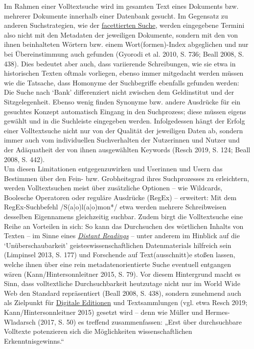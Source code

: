 \documentclass{article}
\begin{document}
    Im Rahmen einer Volltextsuche wird im gesamten Text eines Dokuments bzw. mehrerer Dokumente innerhalb einer Datenbank gesucht. Im Gegensatz zu anderen Suchstrategien, wie der  \href{http://gams.uni-graz.at/o:konde.82}{facettierten Suche}, werden eingegebene Termini also nicht mit den Metadaten der jeweiligen Dokumente, sondern mit den von ihnen beinhalteten Wörtern bzw. einem Wort(formen)-Index abgeglichen und nur bei Übereinstimmung auch gefunden (Gyorodi et al. 2010, S. 736; Beall 2008, S. 438). Dies bedeutet aber auch, dass variierende Schreibungen, wie sie etwa in historischen Texten oftmals vorliegen, ebenso immer mitgedacht werden müssen wie die Tatsache, dass Homonyme der Suchbegriffe ebenfalls gefunden werden: Die Suche nach ‘Bank’ differenziert nicht zwischen dem Geldinstitut und der Sitzgelegenheit. Ebenso wenig finden Synonyme bzw. andere Ausdrücke für ein gesuchtes Konzept automatisch Eingang in den Suchprozess; diese müssen eigens gewählt und in die Suchleiste eingegeben werden. Infolgedessen hängt der Erfolg einer Volltextsuche nicht nur von der Qualität der jeweiligen Daten ab, sondern immer auch vom individuellen Suchverhalten der Nutzerinnen und Nutzer und der Adäquatheit der von ihnen ausgewählten Keywords (Resch 2019, S. 124; Beall 2008, S. 442).
               \\
            
        Um diesen Limitationen entgegenzuwirken und Userinnen und Usern das Bestimmen über den Fein- bzw. Grobheitsgrad ihres Suchprozesses zu erleichtern, werden Volltextsuchen meist über zusätzliche Optionen – wie Wildcards, Boolesche Operatoren oder reguläre Ausdrücke (RegEx) – erweitert: Mit dem RegEx-Suchbefehl /S(a|o)l(a|o)mon*/ etwa werden mehrere Schreibweisen desselben Eigennamens gleichzeitig suchbar. Zudem birgt die Volltextsuche eine Reihe an Vorteilen in sich: So kann das Durchsuchen des wörtlichen Inhalts von Texten – im Sinne eines \emph{\href{http://gams.uni-graz.at/o:konde.71}{Distant Readings}} – unter anderem im Hinblick auf die ‘Unüberschaubarkeit’ geisteswissenschaftlichen Datenmaterials hilfreich sein (Limpinsel 2013, S. 177) und Forschende auf Text(ausschnitt)e stoßen lassen, welche ihnen über eine rein metadatenorientierte Suche eventuell entgangen wären (Kann/Hintersonnleitner 2015, S. 79). Vor diesem Hintergrund macht es Sinn, dass volltextliche Durchsuchbarkeit heutzutage nicht nur im World Wide Web den Standard repräsentiert (Beall 2008, S. 438), sondern zunehmend auch als Zielpunkt für \href{http://gams.uni-graz.at/o:konde.59}{Digitale Editionen} und Textsammlungen (vgl. etwa Resch 2019; Kann/Hintersonnleitner 2015) gesetzt wird – denn wie Müller und Hermes-Wladarsch (2017, S. 50) es treffend zusammenfassen: „Erst über durchsuchbare Volltexte potenzieren sich die Möglichkeiten wissenschaftlichen Erkenntnisgewinns.“\\
            
\end{document}
